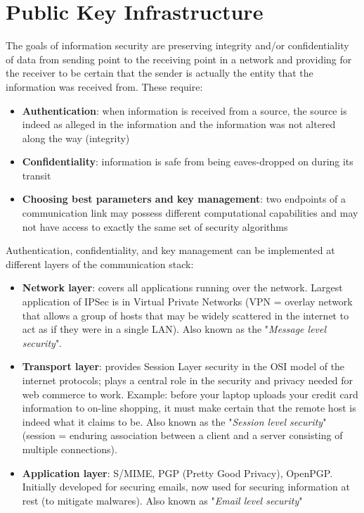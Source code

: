 \documentclass[a4paper, 10pt, titlepage]{article}
\begin{document}
\newpage
\section{Public Key Infrastructure}
The goals of information security are preserving integrity and/or confidentiality of data from sending point to the receiving point in a network and providing for the receiver to be certain that the sender is actually the entity that the information was received from.
These require:
\begin{itemize}
\item \textbf{Authentication}: when information is received from a source, the source is indeed as alleged in the information and the information was not altered along the way (integrity)
\item \textbf{Confidentiality}: information is safe from being eaves-dropped on during its transit
\item \textbf{Choosing best parameters and key management}: two endpoints of a communication link may possess different computational capabilities and may not have access to exactly the same set of security algorithms
\end{itemize}
Authentication, confidentiality, and key management can be implemented at different layers of the communication stack:
\begin{itemize}
\item \textbf{Network layer}: covers all applications running over the network. Largest application of IPSec is in Virtual Private Networks (VPN = overlay network that allows a group of hosts that may be widely scattered in the internet to act as if they were in a single LAN). Also known as the "\textit{Message level security}".
\item \textbf{Transport layer}: provides Session Layer security in the OSI model of the internet protocols; plays a central role in the security and privacy needed for web commerce to work. Example: before your laptop uploads your credit card information to on-line shopping, it must make certain that the remote host is indeed what it claims to be. Also known as the "\textit{Session level security}" (session = enduring association between a client and a server consisting of multiple connections).
\item \textbf{Application layer}: S/MIME, PGP (Pretty Good Privacy), OpenPGP. Initially developed for securing emails, now used for securing information at rest (to mitigate malwares). Also known as "\textit{Email level security}"
\end{itemize}
\end{document}
